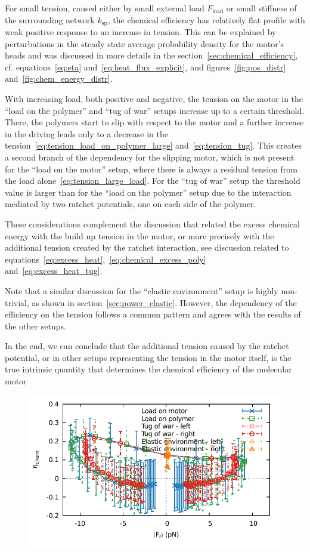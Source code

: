 \documentclass[aps,pre,twocolumn,showpacs,showkeys,superscriptaddress,floatfix]{revtex4-1}
\begin{document}
For small tension, caused either by small external load $F_\text{load}$ or small stiffness of the surrounding network $k_\text{sp}$, 
the chemical efficiency has relatively flat profile with weak positive response to an increase in tension.
This can be explained by perturbations in the steady state average probability density for the motor's heads 
and was discussed in more details in the section~\ref{sec:chemical_efficiency}, 
cf. equations~\eqref{eq:eta} and~\eqref{eq:heat_flux_explicit}, and figures~\ref{fig:pos_distr} and~\ref{fig:chem_energy_distr}.  

With increasing load, both positive and negative, the tension on the motor in the ``load on the polymer'' and ``tug of war'' setups increase up to a certain threshold.
There, the polymers start to slip with respect to the motor and a further increase in the driving leads only to a decrease in the tension~\eqref{eq:tension_load_on_polymer_large} and~\eqref{eq:tension_tug}.
This creates a second branch of the dependency for the slipping motor, 
which is not present for the ``load on the motor'' setup, where there is always a residual tension from the load alone~\eqref{eq:tension_large_load}.  
For the ``tug of war'' setup the threshold value is larger than for the ``load on the polymer'' setup due to the interaction mediated by two ratchet potentials, one on each side of the polymer. 

These considerations complement the discussion that related the excess chemical energy with the build up tension in the motor, or more precisely with the additional tension created by the ratchet interaction, see discussion related to equations~\eqref{eq:excess_heat},~\eqref{eq:chemical_excess_poly} and~\eqref{eq:excess_heat_tug}. 

Note that a similar discussion for the ``elastic environment'' setup is highly non-trivial, as shown in section~\ref{sec:power_elastic}.
However, the dependency of the efficiency on the tension follows a common pattern and agrees with the results of the other setups. 

In the end, we can conclude that the additional tension caused by the ratchet potential, or in other setups representing the tension in the motor itself, is the true intrinsic quantity that determines the chemical efficiency of the molecular motor

\begin{figure}[t]
\centering
\includegraphics[width=.45\textwidth,height=!]{ratchet_eta}
\caption{\label{fig:ratchet_force_efficiency}
}
\end{figure}
\end{document}
